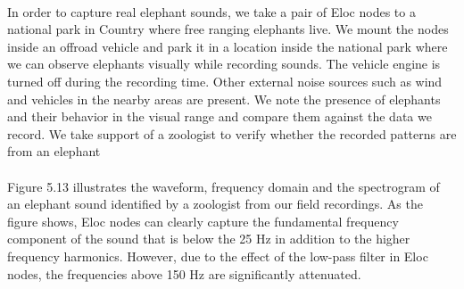 \documentclass[12pt]{article}
\numberwithin{figure}{section}
\numberwithin{table}{section}
\begin{document}
\paragraph{}
In order to capture real elephant sounds, we take a
pair of Eloc nodes to a national park in Country where free
ranging elephants live. We mount the nodes inside an offroad
vehicle and park it in a location inside the national park
where we can observe elephants visually while recording
sounds. The vehicle engine is turned off during the recording
time. Other external noise sources such as wind and vehicles
in the nearby areas are present. We note the presence of elephants
and their behavior in the visual range and compare
them against the data we record. We take support of a zoologist
to verify whether the recorded patterns are from an
elephant
\paragraph{}
Figure 5.13 illustrates the waveform, frequency domain and the spectrogram of an elephant sound identified by
a zoologist from our field recordings. As the figure shows, Eloc nodes can clearly capture the fundamental frequency
component of the sound that is below the 25 Hz in addition to the higher frequency harmonics. However, due to the effect
of the low-pass filter in Eloc nodes, the frequencies above 150 Hz are significantly attenuated.
\end{document}
